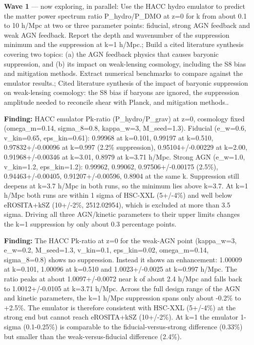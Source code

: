 \documentclass[11pt,a4paper]{article}
\begin{document}
\begin{enumerate}
\end{enumerate}
\textbf{Wave 1} --- now exploring, in parallel: Use the HACC hydro emulator to predict the matter power spectrum ratio P\_hydro/P\_DMO at z=0 for k from about 0.1 to 10 h/Mpc at two or three parameter points: fiducial, strong AGN feedback and weak AGN feedback. Report the depth and wavenumber of the suppression minimum and the suppression at k=1 h/Mpc.; Build a cited literature synthesis covering two topics: (a) the AGN feedback physics that causes baryonic suppression, and (b) its impact on weak-lensing cosmology, including the S8 bias and mitigation methods. Extract numerical benchmarks to compare against the emulator results.; Cited literature synthesis of the impact of baryonic suppression on weak-lensing cosmology: the S8 bias if baryons are ignored, the suppression amplitude needed to reconcile shear with Planck, and mitigation methods..

\textbf{Finding:} HACC emulator Pk-ratio (P\_hydro/P\_grav) at z=0, cosmology fixed (omega\_m=0.14, sigma\_8=0.8, kappa\_w=3, M\_seed=1.3). Fiducial (e\_w=0.6, v\_kin=0.65, eps\_kin=0.61): 0.99968 at k=0.101, 0.99197 at k=0.510, 0.97832+/-0.00096 at k=0.997 (2.2\% suppression), 0.95104+/-0.00229 at k=2.00, 0.91968+/-0.00346 at k=3.01, 0.8979 at k=3.71 h/Mpc. Strong AGN (e\_w=1.0, v\_kin=1.2, eps\_kin=1.2): 0.99962, 0.99062, 0.97506+/-0.00175 (2.5\%), 0.94463+/-0.00405, 0.91207+/-0.00596, 0.8904 at the same k. Suppression still deepens at k=3.7 h/Mpc in both runs, so the minimum lies above k=3.7. At k=1 h/Mpc both runs are within 1 sigma of HSC-XXL (5+/-4\%) and well below eROSITA+kSZ (10+/-2\%, 2512.02954), which is excluded at more than 3.5 sigma. Driving all three AGN/kinetic parameters to their upper limits changes the k=1 suppression by only about 0.3 percentage points.

\textbf{Finding:} The HACC Pk-ratio at z=0 for the weak-AGN point (kappa\_w=3, e\_w=0.2, M\_seed=1.3, v\_kin=0.1, eps\_kin=0.02, omega\_m=0.14, sigma\_8=0.8) shows no suppression. Instead it shows an enhancement: 1.00009 at k=0.101, 1.00096 at k=0.510 and 1.0023+/-0.0025 at k=0.997 h/Mpc. The ratio peaks at about 1.0097+/-0.0072 near k of about 2.4 h/Mpc and falls back to 1.0012+/-0.0105 at k=3.71 h/Mpc. Across the full design range of the AGN and kinetic parameters, the k=1 h/Mpc suppression spans only about -0.2\% to +2.5\%. The emulator is therefore consistent with HSC-XXL (5+/-4\%) at the strong end but cannot reach eROSITA+kSZ (10+/-2\%). At k=1 the emulator 1-sigma (0.1-0.25\%) is comparable to the fiducial-versus-strong difference (0.33\%) but smaller than the weak-versus-fiducial difference (2.4\%).
\end{document}
